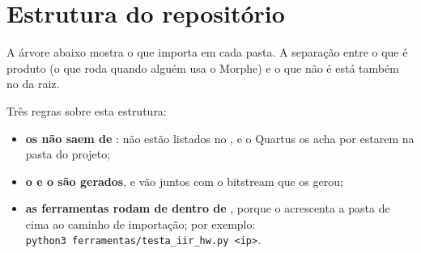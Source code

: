 \chapter{Estrutura do repositório}
\label{ap:repositorio}

A árvore abaixo mostra o que importa em cada pasta. A separação entre o que é
produto (o que roda quando alguém usa o Morphe) e o que não é está também no
 da raiz.

\medskip

\medskip

Três regras sobre esta estrutura:

\begin{itemize}
  \item \textbf{os  não saem de }: não estão
    listados no , e o Quartus os acha por estarem na pasta
    do projeto;
  \item \textbf{o  e o  são
    gerados}, e vão juntos com o bitstream que os gerou;
  \item \textbf{as ferramentas rodam de dentro de }, porque o
     acrescenta a pasta de cima ao caminho de
    importação; por exemplo:\\
    \texttt{python3 ferramentas/testa\_iir\_hw.py <ip>}.
\end{itemize}

